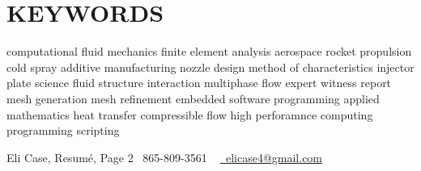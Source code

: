 \documentclass[letterpaper,11pt]{article}
\begin{document}
\section{KEYWORDS}
   \footnotesize{computational fluid mechanics finite element analysis aerospace rocket propulsion cold spray additive manufacturing nozzle design method of characteristics injector plate science fluid structure interaction multiphase flow expert witness report mesh generation mesh refinement embedded software programming applied mathematics heat transfer compressible flow high perforamnce computing programming scripting}

\vfill

Eli Case, Resum\'e, Page 2 \hfill \small \raisebox{-0.1\height}\faPhone\ 865-809-3561 ~ \hfill \href{mailto:elicase4@gmail.com}{\raisebox{-0.2\height}\faEnvelope\  \underline{elicase4@gmail.com}} ~ 
\end{document}
